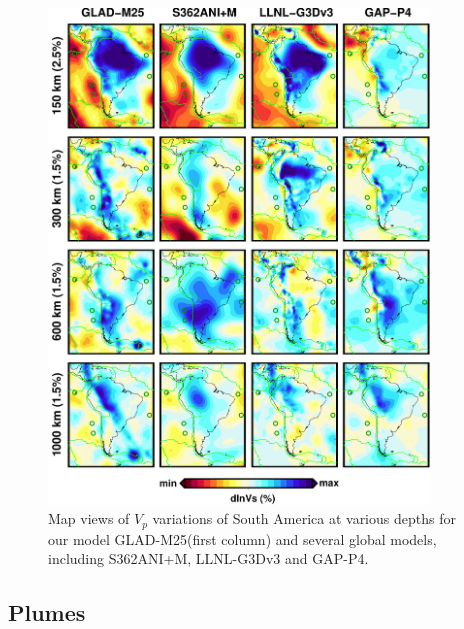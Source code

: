 \documentclass[extra,mreferee]{gji}
\begin{document}
\begin{figure}
\includegraphics[width=0.9\textwidth]{figures/depth_slice/south_america_vp.pdf}
  \caption{Map views of $V_p$ variations of South America at various depths for our model GLAD-M25(first column) and several global models, including S362ANI+M, LLNL-G3Dv3 and GAP-P4\citep{fukao2013subducted}.}
\label{fig:global-vp}
\centering
\end{figure}

\subsection{Plumes}

\end{document}
